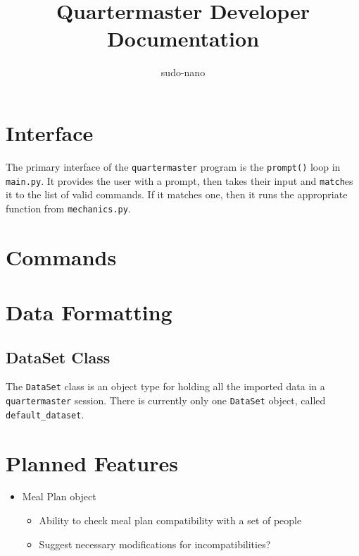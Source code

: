 \documentclass{article}
\title{Quartermaster Developer Documentation}
\author{sudo-nano}
\begin{document}
\maketitle

\tableofcontents

\section{Interface}
The primary interface of the \verb|quartermaster| program is the \verb|prompt()| loop in \verb|main.py|. It provides the user with a prompt, then takes their input and \verb|match|es it to the list of valid commands. If it matches one, then it runs the appropriate function from \verb|mechanics.py|. 


\section{Commands}

\section{Data Formatting}

\subsection{DataSet Class}
The \verb|DataSet| class is an object type for holding all the imported data in a \verb|quartermaster| session. There is currently only one \verb|DataSet| object, called \verb|default_dataset|. 


\section{Planned Features}
\begin{itemize}
	\item Meal Plan object
	
	\begin{itemize}
		\item Ability to check meal plan compatibility with a set of people
		\item Suggest necessary modifications for incompatibilities?
	\end{itemize}

\end{itemize}
\end{document}
